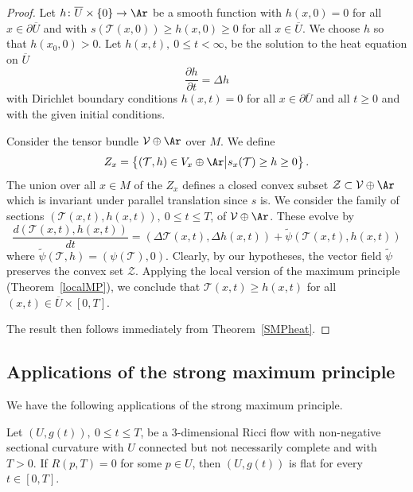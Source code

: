 \begin{proof}
Let $h\colon \overline U\times\{0\}\to \Ar$ be a smooth function
with $h(x,0)=0$ for all $x\in \partial \overline U$ and with
$s({\mathcal T}(x,0))\ge h(x,0)\ge 0$ for all $x\in \overline U$. We
choose $h$ so that $h(x_0,0)>0$. Let $h(x,t),\ 0\le t<\infty$,  be
the solution to the heat equation on $\overline U$
$$\frac{\partial h}{\partial t}=\Delta h$$
with Dirichlet boundary conditions $h(x,t)=0$ for all $x\in \partial
\overline U$ and all $t\ge 0$ and with the given initial conditions.


Consider the tensor bundle ${\mathcal V}\oplus \Ar$ over $M$. We
define
$$Z_x=\left\{({\mathcal T},h)\in V_x\oplus
\Ar\bigl|\bigr. s_x({\mathcal T})\ge h\ge 0\right\}.$$ The union
over all $x\in M$ of the $Z_x$ defines a closed convex subset
${\mathcal Z}\subset {\mathcal V}\oplus \Ar$ which is invariant
under parallel translation since $s$ is. We consider the family of
sections $({\mathcal T}(x,t),h(x,t)),\ 0\le t\le T$, of ${\mathcal
V}\oplus \Ar$. These evolve by
$$\frac{d\left({\mathcal T}(x,t),h(x,t)\right)}{dt}=\left(\Delta {\mathcal T}(x,t),\Delta
h(x,t)\right)+\widetilde \psi\left({\mathcal T}(x,t),h(x,t)\right)$$
where $\widetilde \psi({\mathcal T},h)=\left(\psi({\mathcal
T}),0\right)$. Clearly, by our hypotheses, the vector field
$\widetilde \psi$ preserves the convex set ${\mathcal Z}$. Applying
the local version of the maximum principle (Theorem~\ref{localMP}),
we conclude that ${\mathcal T}(x,t)\ge h(x,t)$ for all $(x,t)\in
\overline U\times [0,T]$.

The result then follows immediately from Theorem~\ref{SMPheat}.
\end{proof}




\subsection{Applications of the strong maximum principle}

We have the following applications of the strong maximum principle.




\begin{theorem}
\label{thm:vanishing-scalar-curvature-forces-flat}\label{firststrongmax}
Let $(U,g(t)),\ 0\le t\le T$, be a $3$-dimensional Ricci flow with
non-negative sectional curvature with $U$ connected but not
necessarily complete and with $T>0$. If $R(p,T)=0$ for some $p\in
U$, then $(U,g(t))$ is flat for every $t\in [0,T]$.
\end{theorem}

